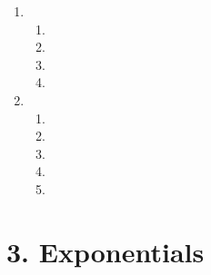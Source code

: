 \begin{enumerate}[itemsep=5pt, label=\textbf{\arabic*}. ]
\item %
\begin{enumerate}[itemsep=5pt,label=\textbf{(\alph*)}]
\item %
\item %
\item %
\item %
\end{enumerate}

\item %
\begin{enumerate}[itemsep=5pt,label=\textbf{(\alph*)}]
\item %
\item %
\item %
\item %
\item %
   

\end{enumerate}
\end{enumerate}



\section {3. Exponentials}

